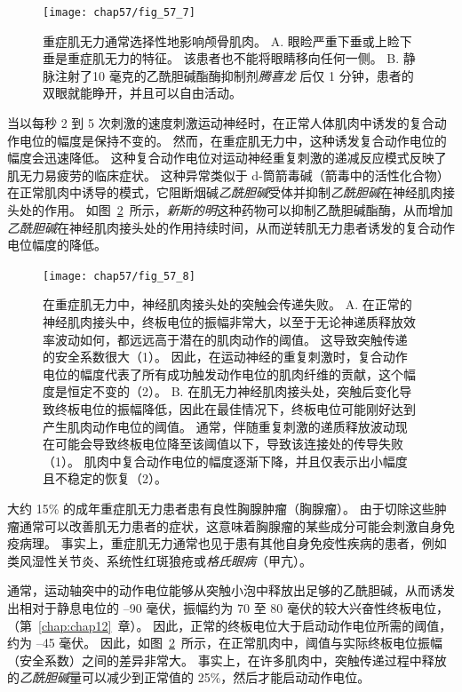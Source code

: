 \begin{figure}[htbp]
	\centering
	\texttt{[image: chap57/fig\_57\_7]}
	\caption{重症肌无力通常选择性地影响颅骨肌肉。
		A. 眼睑严重下垂或上睑下垂是重症肌无力的特征。
		该患者也不能将眼睛移向任何一侧。
		B. 静脉注射了10 毫克的乙酰胆碱酯酶抑制剂\textit{腾喜龙} 后仅 1 分钟，患者的双眼就能睁开，并且可以自由活动。}
	\label{fig:57_7}
\end{figure}


当以每秒 2 到 5 次刺激的速度刺激运动神经时，在正常人体肌肉中诱发的复合动作电位的幅度是保持不变的。
然而，在重症肌无力中，这种诱发复合动作电位的幅度会迅速降低。
这种复合动作电位对运动神经重复刺激的递减反应模式反映了肌无力易疲劳的临床症状。
这种异常类似于 d-筒箭毒碱（箭毒中的活性化合物）在正常肌肉中诱导的模式，它阻断烟碱\textit{乙酰胆碱}受体并抑制\textit{乙酰胆碱}在神经肌肉接头处的作用。
如图~\ref{fig:57_8}~所示，\textit{新斯的明}这种药物可以抑制乙酰胆碱酯酶，从而增加\textit{乙酰胆碱}在神经肌肉接头处的作用持续时间，从而逆转肌无力患者诱发的复合动作电位幅度的降低。


\begin{figure}[htbp]
	\centering
	\texttt{[image: chap57/fig\_57\_8]}
	\caption{在重症肌无力中，神经肌肉接头处的突触会传递失败。
		A. 在正常的神经肌肉接头中，终板电位的振幅非常大，以至于无论神递质释放效率波动如何，都远远高于潜在的肌肉动作的阈值。
		这导致突触传递的安全系数很大（1）。
		因此，在运动神经的重复刺激时，复合动作电位的幅度代表了所有成功触发动作电位的肌肉纤维的贡献，这个幅度是恒定不变的（2）。
		B. 在肌无力神经肌肉接头处，突触后变化导致终板电位的振幅降低，因此在最佳情况下，终板电位可能刚好达到产生肌肉动作电位的阈值。
		通常，伴随重复刺激的递质释放波动现在可能会导致终板电位降至该阈值以下，导致该连接处的传导失败（1）。
		肌肉中复合动作电位的幅度逐渐下降，并且仅表示出小幅度且不稳定的恢复（2）。}
	\label{fig:57_8}
\end{figure}


大约 15\% 的成年重症肌无力患者患有良性胸腺肿瘤（胸腺瘤）。
由于切除这些肿瘤通常可以改善肌无力患者的症状，这意味着胸腺瘤的某些成分可能会刺激自身免疫病理。
事实上，重症肌无力通常也见于患有其他自身免疫性疾病的患者，例如类风湿性关节炎、系统性红斑狼疮或\textit{格氏眼病}（甲亢）。


通常，运动轴突中的动作电位能够从突触小泡中释放出足够的乙酰胆碱，从而诱发出相对于静息电位的 –90 毫伏，振幅约为 70 至 80 毫伏的较大兴奋性终板电位，（第~\ref{chap:chap12}~章）。
因此，正常的终板电位大于启动动作电位所需的阈值，约为 –45 毫伏。
因此，如图~\ref{fig:57_8}~所示，在正常肌肉中，阈值与实际终板电位振幅（安全系数）之间的差异非常大。
事实上，在许多肌肉中，突触传递过程中释放的\textit{乙酰胆碱}量可以减少到正常值的 25\%，然后才能启动动作电位。



